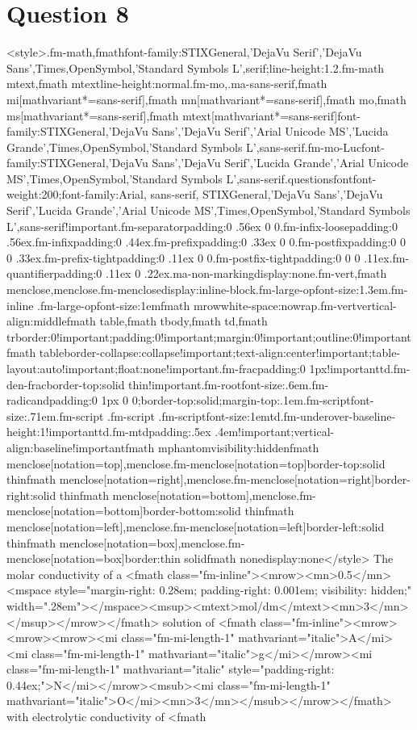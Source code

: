 \documentclass{article}
\begin{document}
\section*{Question 8}
<style>.fm-math,fmath{font-family:STIXGeneral,'DejaVu Serif','DejaVu Sans',Times,OpenSymbol,'Standard Symbols L',serif;line-height:1.2}.fm-math mtext,fmath mtext{line-height:normal}.fm-mo,.ma-sans-serif,fmath mi[mathvariant*=sans-serif],fmath mn[mathvariant*=sans-serif],fmath mo,fmath ms[mathvariant*=sans-serif],fmath mtext[mathvariant*=sans-serif]{font-family:STIXGeneral,'DejaVu Sans','DejaVu Serif','Arial Unicode MS','Lucida Grande',Times,OpenSymbol,'Standard Symbols L',sans-serif}.fm-mo-Luc{font-family:STIXGeneral,'DejaVu Sans','DejaVu Serif','Lucida Grande','Arial Unicode MS',Times,OpenSymbol,'Standard Symbols L',sans-serif}.questionsfont{font-weight:200;font-family:Arial, sans-serif, STIXGeneral,'DejaVu Sans','DejaVu Serif','Lucida Grande','Arial Unicode MS',Times,OpenSymbol,'Standard Symbols L',sans-serif!important}.fm-separator{padding:0 .56ex 0 0}.fm-infix-loose{padding:0 .56ex}.fm-infix{padding:0 .44ex}.fm-prefix{padding:0 .33ex 0 0}.fm-postfix{padding:0 0 0 .33ex}.fm-prefix-tight{padding:0 .11ex 0 0}.fm-postfix-tight{padding:0 0 0 .11ex}.fm-quantifier{padding:0 .11ex 0 .22ex}.ma-non-marking{display:none}.fm-vert,fmath menclose,menclose.fm-menclose{display:inline-block}.fm-large-op{font-size:1.3em}.fm-inline .fm-large-op{font-size:1em}fmath mrow{white-space:nowrap}.fm-vert{vertical-align:middle}fmath table,fmath tbody,fmath td,fmath tr{border:0!important;padding:0!important;margin:0!important;outline:0!important}fmath table{border-collapse:collapse!important;text-align:center!important;table-layout:auto!important;float:none!important}.fm-frac{padding:0 1px!important}td.fm-den-frac{border-top:solid thin!important}.fm-root{font-size:.6em}.fm-radicand{padding:0 1px 0 0;border-top:solid;margin-top:.1em}.fm-script{font-size:.71em}.fm-script .fm-script .fm-script{font-size:1em}td.fm-underover-base{line-height:1!important}td.fm-mtd{padding:.5ex .4em!important;vertical-align:baseline!important}fmath mphantom{visibility:hidden}fmath menclose[notation=top],menclose.fm-menclose[notation=top]{border-top:solid thin}fmath menclose[notation=right],menclose.fm-menclose[notation=right]{border-right:solid thin}fmath menclose[notation=bottom],menclose.fm-menclose[notation=bottom]{border-bottom:solid thin}fmath menclose[notation=left],menclose.fm-menclose[notation=left]{border-left:solid thin}fmath menclose[notation=box],menclose.fm-menclose[notation=box]{border:thin solid}fmath none{display:none}</style> The molar conductivity of a <fmath class="fm-inline"><mrow><mn>0.5</mn><mspace style="margin-right: 0.28em; padding-right: 0.001em; visibility: hidden;" width=".28em">‌</mspace><msup><mtext>mol/dm</mtext><mn>3</mn></msup></mrow></fmath> solution of <fmath class="fm-inline"><mrow><mrow><mrow><mi class="fm-mi-length-1" mathvariant="italic">A</mi><mi class="fm-mi-length-1" mathvariant="italic">g</mi></mrow><mi class="fm-mi-length-1" mathvariant="italic" style="padding-right: 0.44ex;">N</mi></mrow><msub><mi class="fm-mi-length-1" mathvariant="italic">O</mi><mn>3</mn></msub></mrow></fmath> with electrolytic conductivity of <fmath 
\end{document}
